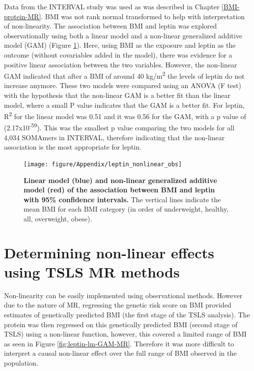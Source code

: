 \documentclass[11pt,twoside]{bristolthesis}
\begin{document}
Data from the INTERVAL study was used as was described in Chapter \ref{BMI-protein-MR}. BMI was not rank normal transformed to help with interpretation of non-linearity. The association between BMI and leptin was explored observationally using both a linear model and a non-linear generalized additive model (GAM) (Figure \ref{fig:leptin-lm-GAM}). Here, using BMI as the exposure and leptin as the outcome (without covariables added in the model), there was evidence for a positive linear association between the two variables. However, the non-linear GAM indicated that after a BMI of around 40 kg/m\textsuperscript{2} the levels of leptin do not increase anymore. These two models were compared using an ANOVA (F test) with the hypothesis that the non-linear GAM is a better fit than the linear model, where a small P value indicates that the GAM is a better fit. For leptin, R\textsuperscript{2} for the linear model was 0.51 and it was 0.56 for the GAM, with a p value of (2.17x10\textsuperscript{-59}). This was the smallest p value comparing the two models for all 4,034 SOMAmers in INTERVAL, therefore indicating that the non-linear association is the most appropriate for leptin.



\begin{figure}

{\centering \texttt{[image: figure/Appendix/leptin\_nonlinear\_obs]} 

}

\caption[Linear model and generalized additive model of the association between BMI and leptin]{\textbf{Linear model (blue) and non-linear generalized additive model (red) of the association between BMI and leptin with 95\% confidence intervals.} The vertical lines indicate the mean BMI for each BMI category (in order of underweight, healthy, all, overweight, obese).}\label{fig:leptin-lm-GAM}
\end{figure}
\hypertarget{determining-non-linear-effects-using-tsls-mr-methods}{%
\section{Determining non-linear effects using TSLS MR methods}\label{determining-non-linear-effects-using-tsls-mr-methods}}

Non-linearity can be easily implemented using observational methods. However due to the nature of MR, regressing the genetic risk score on BMI provided estimates of genetically predicted BMI (the first stage of the TSLS analysis). The protein was then regressed on this genetically predicted BMI (second stage of TSLS) using a non-linear function, however, this covered a limited range of BMI as seen in Figure \ref{fig:leptin-lm-GAM-MR}. Therefore it was more difficult to interpret a causal non-linear effect over the full range of BMI observed in the population.
\end{document}
